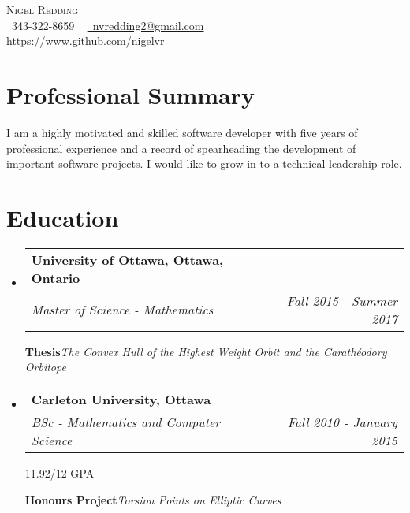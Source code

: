 \documentclass[letterpaper,11pt]{article}
\makeatletter
\newcommand{\resumeSubheading}[4]{
  \vspace{-2pt}\item
    \begin{tabular*}{1.0\textwidth}[t]{l@{\extracolsep{\fill}}r}
      \textbf{#1} & \textbf{\small #2} \\
      \textit{\small#3} & \textit{\small #4} \\
    \end{tabular*}\vspace{-7pt}
}
\newcommand{\resumeSubHeadingListStart}{\begin{itemize}[leftmargin=0.0in, label={}]}
\newcommand{\resumeSubHeadingListEnd}{\end{itemize}}
\makeatother
\begin{document}
\begin{center}
    {\Huge \scshape Nigel Redding} \\ \vspace{1pt}
    \small
    \raisebox{-0.1\height}\faPhone\ 343-322-8659 ~
    \href{mailto:youremail@gmail.com}{\faEnvelope\ nvredding2@gmail.com} ~ \\
    \href{github}{https://www.github.com/nigelvr} ~
\end{center}


\section{Professional Summary}
  \small{I am a highly motivated and skilled software developer with five years of professional experience and a record of
  spearheading the development of important software projects. I would like to grow in to a technical leadership
  role.}
\vspace{-5pt}


\section{Education}
  \resumeSubHeadingListStart
    \resumeSubheading
      {University of Ottawa, Ottawa, Ontario}{}
      {Master of Science - Mathematics}{Fall 2015 - Summer 2017}

      \small{\textbf{Thesis}}\emph{The Convex Hull of the Highest Weight Orbit and the Carathéodory Orbitope}
      
    \resumeSubheading
      {Carleton University, Ottawa}{}
      {BSc - Mathematics and Computer Science}{Fall 2010 - January 2015}

      {11.92/12 GPA}{}

      \small{\textbf{Honours Project}}\emph{Torsion Points on Elliptic Curves}
      
  \resumeSubHeadingListEnd
\vspace{-5pt}

\end{document}
